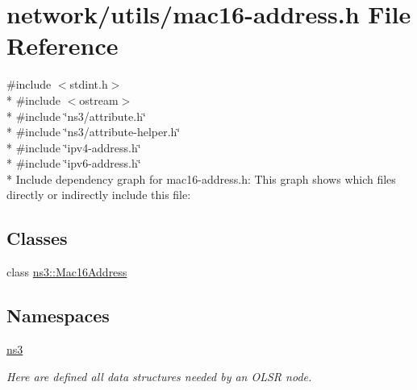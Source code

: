 \hypertarget{mac16-address_8h}{}\section{network/utils/mac16-\/address.h File Reference}
\label{mac16-address_8h}
{\ttfamily \#include $<$stdint.\+h$>$}\\*
{\ttfamily \#include $<$ostream$>$}\\*
{\ttfamily \#include \char`\"{}ns3/attribute.\+h\char`\"{}}\\*
{\ttfamily \#include \char`\"{}ns3/attribute-\/helper.\+h\char`\"{}}\\*
{\ttfamily \#include \char`\"{}ipv4-\/address.\+h\char`\"{}}\\*
{\ttfamily \#include \char`\"{}ipv6-\/address.\+h\char`\"{}}\\*
Include dependency graph for mac16-\/address.h\+:
This graph shows which files directly or indirectly include this file\+:
\subsection*{Classes}
\begin{DoxyCompactItemize}
\item 
class \hyperlink{classns3_1_1Mac16Address}{ns3\+::\+Mac16\+Address}
\end{DoxyCompactItemize}
\subsection*{Namespaces}
\begin{DoxyCompactItemize}
\item 
 \hyperlink{namespacens3}{ns3}
\begin{DoxyCompactList}\small\item\em Here are defined all data structures needed by an O\+L\+SR node. \end{DoxyCompactList}\end{DoxyCompactItemize}
